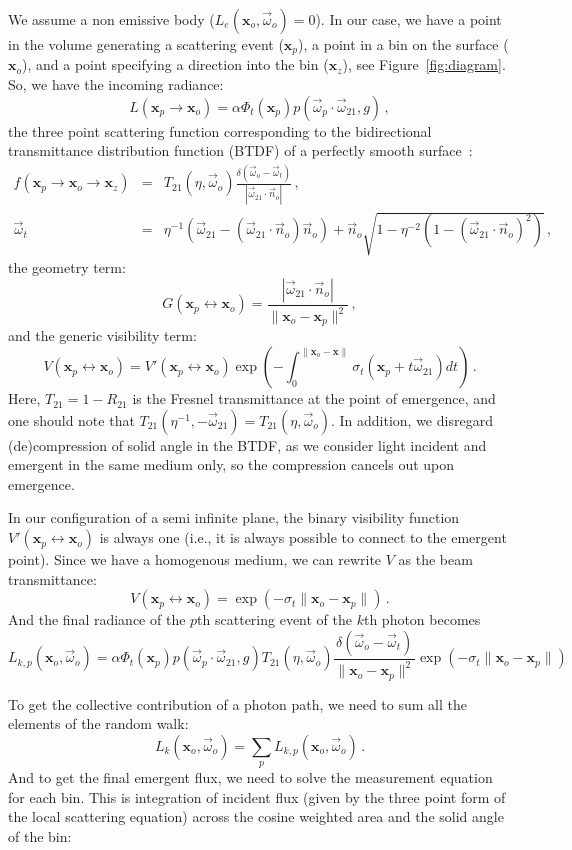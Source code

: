 \documentclass[10pt,a4paper]{article}
\newcommand{\x}{\mathbf{x}}
\newcommand{\y}{\mathbf{x}_o}
\newcommand{\z}{\mathbf{x}_z}
\newcommand{\vomega}{\vec{\omega}}
\begin{document}
We assume a non emissive body ($L_e(\x_o, \vomega_o) = 0$). In our case, we have a point in the volume generating a scattering event ($\x_p$), a point in a bin on the surface ($\y$), and a point specifying a direction into the bin ($\z$), see Figure~\ref{fig:diagram}. So, we have the incoming radiance:
%
\[
L(\x_p \rightarrow \y) = \alpha \Phi_t(\mathbf{x}_p) p(\vomega_p \cdot \vomega_{21}, g) \, ,
\]
%
the three point scattering function corresponding to the bidirectional transmittance distribution function (BTDF) of a perfectly smooth surface~\cite{pharr17}:
%
\begin{eqnarray*}
f(\x_p \rightarrow \y \rightarrow \z) & = & T_{21}(\eta, \vomega_o) \frac{\delta(\vomega_o - \vomega_t)}{|\vomega_{21}\cdot\vec{n}_o|} \, , \\
\vomega_t & = & \eta^{-1}(\vomega_{21} - (\vomega_{21}\cdot\vec{n}_o)\vec{n}_o) + \vec{n}_o \sqrt{1 - \eta^{-2}(1 - (\vomega_{21}\cdot\vec{n}_o)^2)} \, ,
\end{eqnarray*}
%
the geometry term:
%
\[
G(\x_p \leftrightarrow \y) = \frac{|\vomega_{21}\cdot\vec{n}_o |}{\|\y - \x_p\|^2} \, ,
\]
%
and the generic visibility term:
%
\[
V(\x_p \leftrightarrow \y) = V'(\x_p \leftrightarrow \y) \exp\left(-\int_0^{\|\y - \x\|} \sigma_t\left(\x_p + t \vomega_{21}\right) dt\right) \, .
\]
%
Here, $T_{21} = 1 - R_{21}$ is the Fresnel transmittance at the point of emergence, and one should note that $T_{21}(\eta^{-1}, -\vomega_{21}) = T_{21}(\eta, \vomega_o)$. In addition, we disregard (de)compression of solid angle in the BTDF, as we consider light incident and emergent in the same medium only, so the compression cancels out upon emergence.

In our configuration of a semi infinite plane, the binary visibility function $V'(\x_p \leftrightarrow \y)$ is always one (i.e., it is always possible to connect to the emergent point). Since we have a homogenous medium, we can rewrite $V$ as the beam transmittance:
%
\[
V(\x_p \leftrightarrow \y) = \exp(-\sigma_t \|\y - \x_p\|) \, .
\]
%
And the final radiance of the $p$th scattering event of the $k$th photon becomes
%
\[
L_{k,p}(\x_o, \vomega_o) = \alpha \Phi_t(\mathbf{x}_p) p(\vomega_p \cdot \vomega_{21}, g)  T_{21}(\eta, \vomega_o) \frac{\delta(\vomega_o - \vomega_t)}{\|\y - \x_p\|^2} \exp(-\sigma_t \|\y - \x_p\|)
\]

To get the collective contribution of a photon path, we need to sum all the elements of the random walk:
%
\[
L_k(\x_o, \vomega_o) = \sum_p L_{k,p}(\x_o, \vomega_o) \, .
\]
%
And to get the final emergent flux, we need to solve the measurement equation for each bin. This is integration of incident flux (given by the three point form of the local scattering equation) across the cosine weighted area and the solid angle of the bin:
\end{document}
